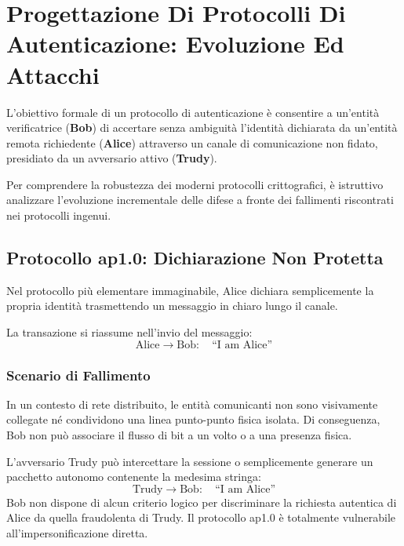 \documentclass[11pt, a4paper]{article}
\begin{document}
\newpage

\section{Progettazione Di Protocolli Di Autenticazione: Evoluzione Ed Attacchi}

L'obiettivo formale di un protocollo di autenticazione è consentire a un'entità verificatrice (\textbf{Bob}) di accertare senza ambiguità l'identità dichiarata da un'entità remota richiedente (\textbf{Alice}) attraverso un canale di comunicazione non fidato, presidiato da un avversario attivo (\textbf{Trudy}).

Per comprendere la robustezza dei moderni protocolli crittografici, è istruttivo analizzare l'evoluzione incrementale delle difese a fronte dei fallimenti riscontrati nei protocolli ingenui.

\subsection{Protocollo ap1.0: Dichiarazione Non Protetta}

Nel protocollo più elementare immaginabile, Alice dichiara semplicemente la propria identità trasmettendo un messaggio in chiaro lungo il canale.


La transazione si riassume nell'invio del messaggio:
\[
\text{Alice} \longrightarrow \text{Bob}: \quad \text{``I am Alice''}
\]

\subsubsection{Scenario di Fallimento}
In un contesto di rete distribuito, le entità comunicanti non sono visivamente collegate né condividono una linea punto-punto fisica isolata. Di conseguenza, Bob non può associare il flusso di bit a un volto o a una presenza fisica.


L'avversario Trudy può intercettare la sessione o semplicemente generare un pacchetto autonomo contenente la medesima stringa:
\[
\text{Trudy} \longrightarrow \text{Bob}: \quad \text{``I am Alice''}
\]
Bob non dispone di alcun criterio logico per discriminare la richiesta autentica di Alice da quella fraudolenta di Trudy. Il protocollo ap1.0 è totalmente vulnerabile all'impersonificazione diretta.
\end{document}

